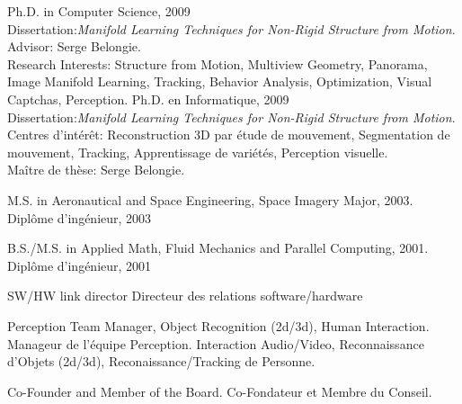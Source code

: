 \documentclass{article}
\begin{document}


\begin{llist}

 
{
Ph.D. in Computer Science, 2009\\
Dissertation:\textit{Manifold Learning Techniques for Non-Rigid Structure from
Motion}.\\
Advisor: Serge Belongie.\\
Research Interests: Structure from Motion, Multiview Geometry, Panorama, Image Manifold Learning, Tracking, Behavior Analysis, Optimization, Visual Captchas, Perception.
}
{
Ph.D. en Informatique, 2009\\
Dissertation:\textit{Manifold Learning Techniques for Non-Rigid Structure from
Motion}.\\
Centres d'int\'{e}r\^{e}t: Reconstruction 3D par \'{e}tude de mouvement, Segmentation de mouvement, Tracking, 
Apprentissage de vari\'{e}t\'{e}s, Perception visuelle.\\
Ma\^{i}tre de th\`{e}se: Serge Belongie.
}

 
{
M.S. in Aeronautical and Space Engineering, Space Imagery Major, 2003.
}
{
Dipl\^{o}me d'ing\'{e}nieur, 2003
}

 
{
B.S./M.S. in Applied Math, Fluid Mechanics and Parallel Computing, 2001.
}
{
Dipl\^{o}me d'ing\'{e}nieur, 2001
}

{
}
{
}

{
SW/HW link director
}
{
Directeur des relations software/hardware
}

{
Perception Team Manager, Object Recognition (2d/3d), Human Interaction.
}
{
Manageur de l'\'{e}quipe Perception. Interaction Audio/Video, Reconnaissance d'Objets (2d/3d), Reconaissance/Tracking de 
Personne.
}

{
Co-Founder and Member of the Board.
}
{
Co-Fondateur et Membre du Conseil.
}


\end{llist}
\end{document}
